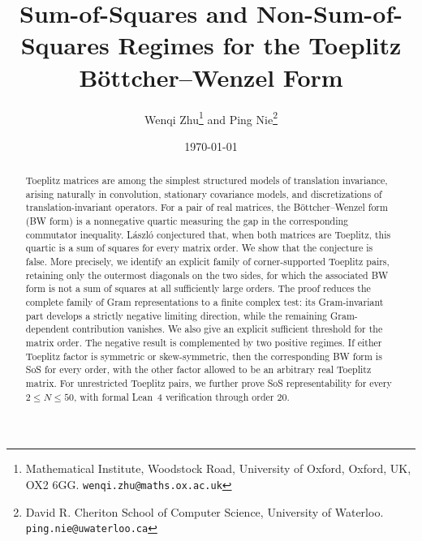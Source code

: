 \documentclass[10pt,a4paper]{article}
\title{Sum-of-Squares and Non-Sum-of-Squares Regimes for the Toeplitz Böttcher–Wenzel Form}
\author{Wenqi Zhu\thanks{Mathematical Institute, Woodstock Road, University of Oxford, Oxford, UK, OX2 6GG.  {\tt wenqi.zhu@maths.ox.ac.uk} } \quad and \quad
Ping Nie\thanks{David R. Cheriton School of Computer Science, University of Waterloo.
{\tt ping.nie@uwaterloo.ca}}}
\date{\today}
\theoremstyle{definition}
\begin{document}
\maketitle

\begin{abstract}
Toeplitz matrices are among the simplest structured models of
translation invariance, arising naturally in convolution, stationary
covariance models, and discretizations of translation-invariant
operators.  For a pair of real matrices, the B\"ottcher--Wenzel form
(BW form) is a nonnegative quartic measuring the gap in the
corresponding commutator inequality.  L\'aszl\'o conjectured that,
when both matrices are Toeplitz, this quartic is a sum of squares
for every matrix order. 
We show that the conjecture is false.  More precisely, we identify an
explicit family of corner-supported Toeplitz pairs, retaining only the
outermost diagonals on the two sides, for which the associated BW form
is not a sum of squares at all sufficiently large orders.  The proof
reduces the complete family of Gram representations to a finite complex
test: its Gram-invariant part develops a strictly negative limiting
direction, while the remaining Gram-dependent contribution vanishes.
We also give an explicit sufficient threshold for the matrix order. 
The negative result is complemented by two positive regimes.  If either
Toeplitz factor is symmetric or skew-symmetric, then the corresponding
BW form is SoS for every order, with the other factor allowed to be an
arbitrary real Toeplitz matrix.  For unrestricted Toeplitz pairs, we
further prove SoS representability for every $2\le N\le50$, with
formal Lean~4 verification through order $20$.
\end{abstract}






\appendix







\scriptsize


\end{document}
